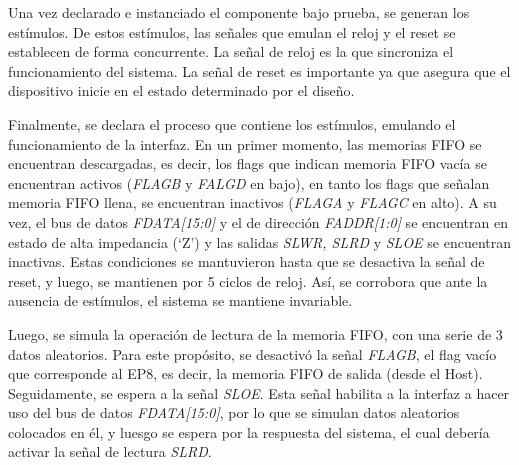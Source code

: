 Una vez declarado e instanciado el componente bajo prueba, se generan los estímulos. De estos estímulos, las señales que emulan el reloj y el reset se establecen de forma concurrente. La señal de reloj es la que sincroniza el funcionamiento del sistema. La señal de reset es importante ya que asegura que el dispositivo inicie en el estado determinado por el diseño. 

% 
%
%

Finalmente, se declara el proceso que contiene los estímulos, emulando el funcionamiento de la interfaz. En un primer momento, las memorias FIFO se encuentran descargadas, es decir, los flags que indican memoria FIFO vacía se encuentran activos ({\it FLAGB} y {\it FALGD} en bajo), en tanto los flags que señalan memoria FIFO llena, se encuentran inactivos ({\it FLAGA} y {\it FLAGC} en alto).
A su vez, el bus de datos {\it FDATA[15:0]} y el de dirección {\it FADDR[1:0]} se encuentran en estado de alta impedancia (`Z') y las salidas {\it SLWR, SLRD} y {\it SLOE} se encuentran inactivas. Estas condiciones se mantuvieron hasta que se desactiva la señal de reset, y luego, se mantienen por 5 ciclos de reloj. Así, se corrobora que ante la ausencia de estímulos, el sistema se mantiene invariable.

Luego, se simula la operación de lectura de la memoria FIFO, con una serie de 3 datos aleatorios. Para este propósito, se desactivó la señal {\it FLAGB}, el flag vacío que corresponde al EP8, es decir, la memoria FIFO de salida (desde el Host). Seguidamente, se espera a la señal {\it SLOE}. Esta señal habilita a la interfaz a hacer uso del bus de datos {\it FDATA[15:0]}, por lo que se simulan datos aleatorios colocados en él, y luesgo se espera por la respuesta del sistema, el cual debería activar la señal de lectura {\it SLRD}.

